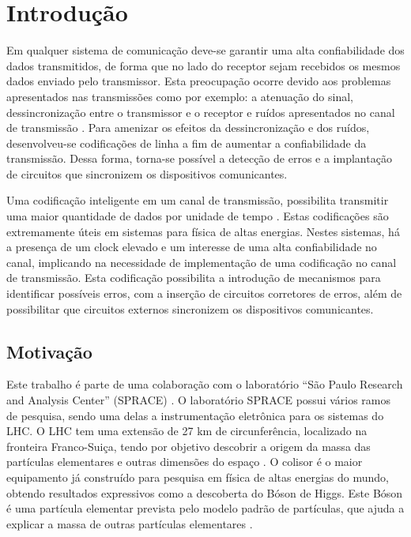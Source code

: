 \chapter[Introdução]{Introdução}

Em qualquer sistema de comunicação deve-se garantir uma alta confiabilidade dos dados transmitidos, de forma que no lado do receptor sejam recebidos os mesmos dados enviado pelo transmissor. Esta preocupação ocorre devido aos problemas apresentados nas transmissões como por exemplo: a atenuação do sinal, dessincronização entre o transmissor e o receptor e ruídos apresentados no canal de transmissão \cite{Renato2018}. Para amenizar os efeitos da dessincronização e dos ruídos, desenvolveu-se codificações de linha a fim de aumentar a confiabilidade da transmissão. Dessa forma, torna-se possível a detecção de erros e a implantação de circuitos que sincronizem os dispositivos comunicantes.

Uma codificação inteligente em um canal de transmissão, possibilita transmitir uma maior quantidade de dados por unidade de tempo \cite{Comer2016}. Estas codificações são extremamente úteis em sistemas para física de altas energias. Nestes sistemas, há a presença de um clock elevado e um interesse de uma alta confiabilidade no canal, implicando na necessidade de implementação de uma codificação no canal de transmissão. Esta codificação possibilita a introdução de mecanismos para identificar possíveis erros, com a inserção de circuitos corretores de erros, além de possibilitar que circuitos externos sincronizem os dispositivos comunicantes.

\section{Motivação}

Este trabalho é parte de uma colaboração com o laboratório “São Paulo Research and Analysis Center” (SPRACE) \cite{Sprace2018}. O laboratório SPRACE possui vários ramos de pesquisa, sendo uma delas a instrumentação eletrônica para os sistemas do LHC. O LHC tem uma extensão de 27 km de circunferência, localizado na fronteira Franco-Suiça, tendo por objetivo descobrir a origem da massa das partículas elementares e outras dimensões do espaço \cite{Wikipedia2018}. O colisor é o maior equipamento já construído para pesquisa em física de altas energias do mundo, obtendo resultados expressivos como a descoberta do Bóson de Higgs. Este Bóson é uma partícula elementar prevista pelo modelo padrão de partículas, que ajuda a explicar a massa de outras partículas elementares \cite{Randal2013}.

